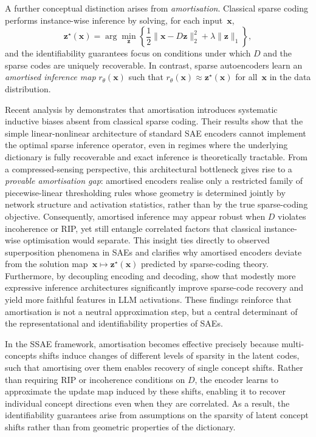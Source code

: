 \documentclass{article}
\begin{document}
A further conceptual distinction arises from \emph{amortisation}. Classical sparse coding performs instance-wise inference by solving, for each input~$\boldsymbol{x}$,
\begin{equation}
\label{eq:sc}
\boldsymbol{z}^\star(\boldsymbol{x})
= \arg\min_{\boldsymbol{z}} 
\left\{
\frac12 \lVert \boldsymbol{x} - D \boldsymbol{z} \rVert_2^2
+ \lambda \lVert \boldsymbol{z} \rVert_1
\right\},
\end{equation}
and the identifiability guarantees focus on conditions under which $D$ and the sparse codes are uniquely recoverable. In contrast, sparse autoencoders learn an \emph{amortised inference map} $r_\theta(\boldsymbol{x})$ such that $r_\theta(\boldsymbol{x}) \approx \boldsymbol{z}^\star(\boldsymbol{x})$ for all~$\boldsymbol{x}$ in the data distribution. 

Recent analysis by \citet{oneill2025computeoptimalinferenceprovable} demonstrates that amortisation introduces systematic inductive biases absent from classical sparse coding. Their results show that the simple linear-nonlinear architecture of standard SAE encoders cannot implement the optimal sparse inference operator, even in regimes where the underlying dictionary is fully recoverable and exact inference is theoretically tractable. From a compressed-sensing perspective, this architectural bottleneck gives rise to a \emph{provable amortisation gap}: amortised encoders realise only a restricted family of piecewise-linear thresholding rules whose geometry is determined jointly by network structure and activation statistics, rather than by the true sparse-coding objective. Consequently, amortised inference may appear robust when $D$ violates incoherence or RIP, yet still entangle correlated factors that classical instance-wise optimisation would separate. This insight ties directly to observed superposition phenomena in SAEs and clarifies why amortised encoders deviate from the solution map~$\boldsymbol{x}\mapsto\boldsymbol{z}^\star(\boldsymbol{x})$ predicted by sparse-coding theory. Furthermore, by decoupling encoding and decoding, \citet{oneill2025computeoptimalinferenceprovable} show that modestly more expressive inference architectures significantly improve sparse-code recovery and yield more faithful features in LLM activations. These findings reinforce that amortisation is not a neutral approximation step, but a central determinant of the representational and identifiability properties of SAEs.

In the SSAE framework, amortisation becomes effective precisely because multi-concepts shifts induce changes of different levels of sparsity in the latent codes, such that amortising over them enables recovery of single concept shifts. Rather than requiring RIP or incoherence conditions on $D$, the encoder learns to approximate the update map induced by these shifts, enabling it to recover individual concept directions even when they are correlated. As a result, the identifiability guarantees arise from assumptions on the sparsity of latent concept shifts rather than from geometric properties of the dictionary.
\end{document}
